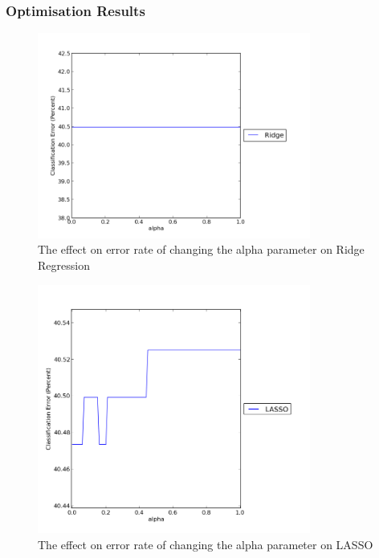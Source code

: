\subsubsection{Optimisation Results}

\begin{figure}[h!]
\centering
\includegraphics[width=0.8\textwidth]{images/ridgealpha.png}
\caption{The effect on error rate of changing the alpha parameter on Ridge Regression}
\label{fig:ridgealpha}
\end{figure}

\begin{figure}[h!]
\centering
\includegraphics[width=0.8\textwidth]{images/lassoalpha.png}
\caption{The effect on error rate of changing the alpha parameter on LASSO}
\label{fig:lassoalpha}
\end{figure}

